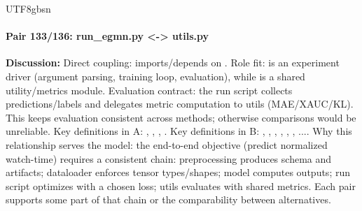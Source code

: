 \documentclass[11pt]{article}
\begin{document}
\begin{CJK*}{UTF8}{gbsn}
\paragraph{Pair 133/136: run\_egmn.py <-> utils.py}
\textbf{Discussion:} Direct coupling: \texttt{} imports/depends on \texttt{}. Role fit: \texttt{} is an experiment driver (argument parsing, training loop, evaluation), while \texttt{} is a shared utility/metrics module. Evaluation contract: the run script collects predictions/labels and delegates metric computation to utils (MAE/XAUC/KL). This keeps evaluation consistent across methods; otherwise comparisons would be unreliable. Key definitions in A: \texttt{}, \texttt{}, \texttt{}, \texttt{}. Key definitions in B: \texttt{}, \texttt{}, \texttt{}, \texttt{}, \texttt{}, \texttt{}, .... Why this relationship serves the model: the end-to-end objective (predict normalized watch-time) requires a consistent chain: preprocessing produces schema and artifacts; dataloader enforces tensor types/shapes; model computes outputs; run script optimizes with a chosen loss; utils evaluates with shared metrics. Each pair supports some part of that chain or the comparability between alternatives.


\end{CJK*}
\end{document}
